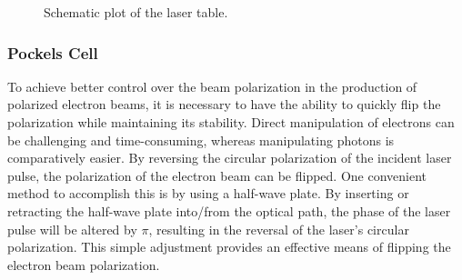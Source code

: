 \begin{figure}[!h]
    \caption{Schematic plot of the laser table.}
    \label{fig:laser_table}
\end{figure}

\subsubsection{Pockels Cell}
To achieve better control over the beam polarization in the production of polarized electron beams, it is necessary to have the ability to quickly flip the polarization while maintaining its stability. Direct manipulation of electrons can be challenging and time-consuming, whereas manipulating photons is comparatively easier. By reversing the circular polarization of the incident laser pulse, the polarization of the electron beam can be flipped. One convenient method to accomplish this is by using a half-wave plate. By inserting or retracting the half-wave plate into/from the optical path, the phase of the laser pulse will be altered by $\pi$, resulting in the reversal of the laser's circular polarization. This simple adjustment provides an effective means of flipping the electron beam polarization.

